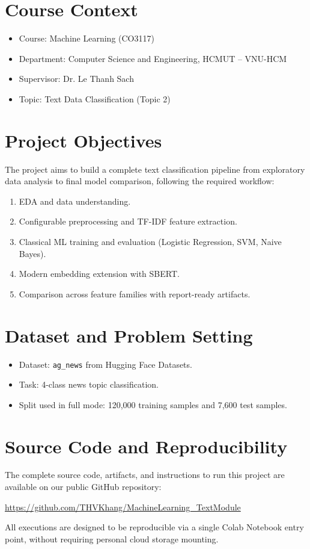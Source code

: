 \documentclass[a4paper,12pt]{article}
\begin{document}
\newpage
\tableofcontents
\newpage

\section{Course Context}

\begin{itemize}[leftmargin=*]
    \item Course: Machine Learning (CO3117)
    \item Department: Computer Science and Engineering, HCMUT -- VNU-HCM
    \item Supervisor: Dr. Le Thanh Sach
    \item Topic: Text Data Classification (Topic 2)
\end{itemize}

\section{Project Objectives}
The project aims to build a complete text classification pipeline from exploratory data analysis to final model comparison, following the required workflow:
\begin{enumerate}[leftmargin=*]
    \item EDA and data understanding.
    \item Configurable preprocessing and TF-IDF feature extraction.
    \item Classical ML training and evaluation (Logistic Regression, SVM, Naive Bayes).
    \item Modern embedding extension with SBERT.
    \item Comparison across feature families with report-ready artifacts.
\end{enumerate}

\section{Dataset and Problem Setting}
\begin{itemize}[leftmargin=*]
    \item Dataset: \texttt{ag\_news} from Hugging Face Datasets.
    \item Task: 4-class news topic classification.
    \item Split used in full mode: 120,000 training samples and 7,600 test samples.
\end{itemize}

\section{Source Code and Reproducibility}
The complete source code, artifacts, and instructions to run this project are available on our public GitHub repository:
\begin{center}
    \url{https://github.com/THVKhang/MachineLearning_TextModule}
\end{center}
All executions are designed to be reproducible via a single Colab Notebook entry point, without requiring personal cloud storage mounting.
\end{document}
